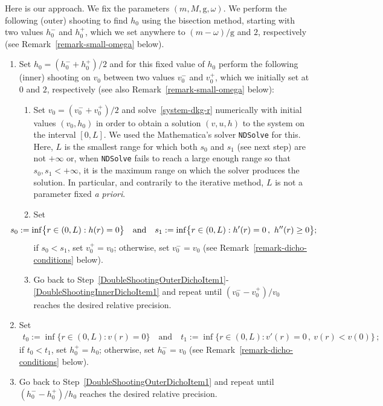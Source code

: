 \documentclass[12pt]{extarticle}
\newcommand{\coupling}{\mathrm{g}}
\theoremstyle{plain}
\theoremstyle{remark}
\begin{document}
Here is our approach.
We fix the parameters $(m,M,\coupling,\omega)$.
We perform the following (outer)
shooting to find $h_0$
using the bisection method,
starting with two values $h_0^-$ and $h_0^+$,
which we set anywhere to $(m-\omega)/\coupling$ and $2$, respectively
(see Remark~\ref{remark-small-omega}
below).

\begin{enumerate}[label=\arabic*)]
    \item\label{DoubleShootingOuterDichoItem1}
Set $h_0=(h_0^- + h_0^+)/2$ and for this fixed value of $h_0$ perform the following (inner) shooting on $v_0$
between two values $v_0^-$ and $v_0^+$,
which we initially set at
$0$ and $2$, respectively
(see also Remark~\ref{remark-small-omega}
below):
\begin{enumerate}[label=\roman*)]
\item\label{DoubleShootingInnerDichoItem1}
Set $v_0=(v_0^- + v_0^+)/2$
and
solve~\eqref{system-dkg-r} numerically with initial values $(v_0, h_0)$
in order to obtain a solution $(v, u, h)$ to the system on the interval $[0,L]$. We used the Mathematica's solver \texttt{NDSolve} for this.
Here, $L$ is the smallest range for which both $s_0$ and $s_1$ (see next step) are not $+\infty$ or,
when \texttt{NDSolve} fails to reach a large enough range so that $s_0, s_1<+\infty$, it is the maximum range on which the solver produces the solution. In particular, and contrarily to the iterative method, $L$ is not a parameter fixed \emph{a priori}.
            
\item\label{DoubleShootingInnerDichoItem2}
Set
\begin{align*}
\hskip -10mm
s_0:= \inf\bigl\{r \in (0,L) : h(r)=0\bigr\}
\quad
\mbox{and}
\quad
s_1:= \inf\bigl\{r \in (0,L) : h'(r)=0\,, \ h''(r)\geq0\bigr\};
\end{align*}
if $s_0<s_1$, set $v_0^+=v_0$;
otherwise, set $v_0^-=v_0$ (see Remark~\ref{remark-dicho-conditions}
below).
\item\label{DoubleShootingInnerDichoItem3}
Go back to Step~\ref{DoubleShootingOuterDichoItem1}-\ref{DoubleShootingInnerDichoItem1}
and repeat until  $(v_0^--v_0^+)/v_0$ reaches the desired relative precision.
\end{enumerate}
\item\label{DoubleShootingOuterDichoItem2}
Set
\begin{align*}
    t_0 := \inf\bigl\{r \in (0,L) : v(r)=0\bigr\}
\quad
\mbox{and}
\quad
    t_1 := \inf\bigl\{r \in (0,L) : v'(r)=0\,, \ v(r) < v(0)\bigr\}\,;
\end{align*}
if $t_0<t_1$, set $h_0^+=h_0$;
otherwise, set $h_0^-=v_0$ (see Remark~\ref{remark-dicho-conditions}
below).
\item\label{DoubleShootingOuterDichoItem3} Go back to Step~\ref{DoubleShootingOuterDichoItem1} and repeat until $(h_0^--h_0^+)/h_0$ reaches the desired relative precision.
\end{enumerate}
\end{document}

